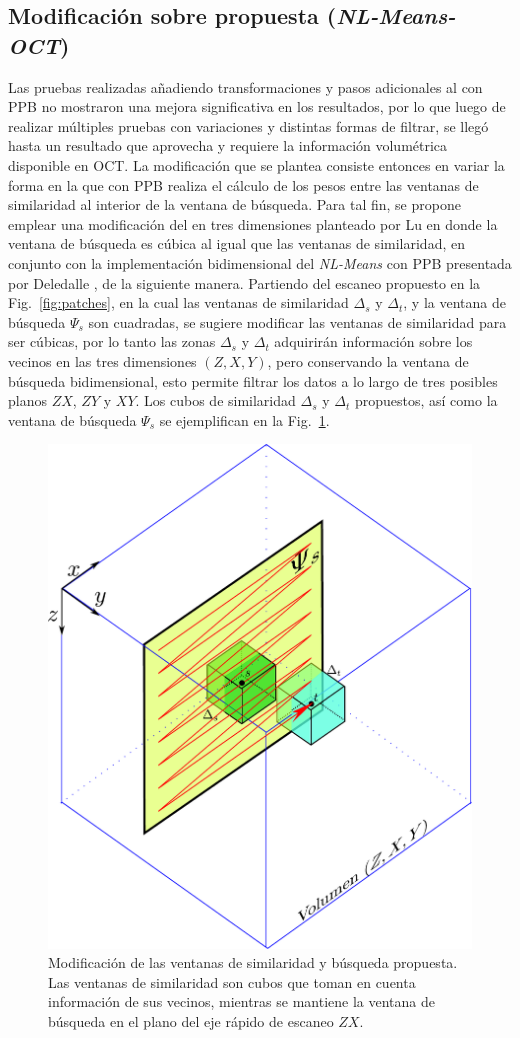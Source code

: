 \subsection{Modificación sobre \nlmeans propuesta (\textit{NL-Means-OCT})}

Las pruebas realizadas añadiendo transformaciones y pasos adicionales al \nlmeans con PPB no mostraron una mejora significativa en los resultados, por lo que luego de realizar múltiples pruebas con variaciones y distintas formas de filtrar, se llegó hasta un resultado que aprovecha y requiere la información volumétrica disponible en OCT. La modificación que se plantea consiste entonces en variar la forma en la que \nlmeans con PPB realiza el cálculo de los pesos entre las ventanas de similaridad al interior de la ventana de búsqueda. Para tal fin, se propone emplear una modificación del \nlmeans en tres dimensiones planteado por Lu \etal \cite{Lu2011} en donde la ventana de búsqueda es cúbica al igual que las ventanas de similaridad, en conjunto con la implementación bidimensional del \textit{NL-Means} con PPB presentada por Deledalle \etal \cite{Deledalle2009}, de la siguiente manera. Partiendo del escaneo propuesto en la Fig.~\ref{fig:patches}, en la cual las ventanas de similaridad $\Delta_s$ y $\Delta_t$, y la ventana de búsqueda $\Psi_s$ son cuadradas, se sugiere modificar las ventanas de similaridad para ser cúbicas, por lo tanto las zonas $\Delta_s$ y $\Delta_t$ adquirirán información sobre los vecinos en las tres dimensiones $(Z,X,Y)$, pero conservando la ventana de búsqueda bidimensional, esto permite filtrar los datos a lo largo de tres posibles planos $ZX$, $ZY$ y $XY$. Los cubos de similaridad $\Delta_s$ y $\Delta_t$ propuestos, así como la ventana de búsqueda $\Psi_s$ se ejemplifican en la Fig.~\ref{fig:Patches_propuesta}.

\begin{figure}
	\centering
	\includegraphics[width=0.4\linewidth]{img/chap3/Patches_propuesta}
	\caption[Modificación de las ventanas de similaridad y búsqueda propuesta.]{Modificación de las ventanas de similaridad y búsqueda propuesta. Las ventanas de similaridad son cubos que toman en cuenta información de sus vecinos, mientras se mantiene la ventana de búsqueda en el plano del eje rápido de escaneo $ZX$.}
	\label{fig:Patches_propuesta}
\end{figure}

